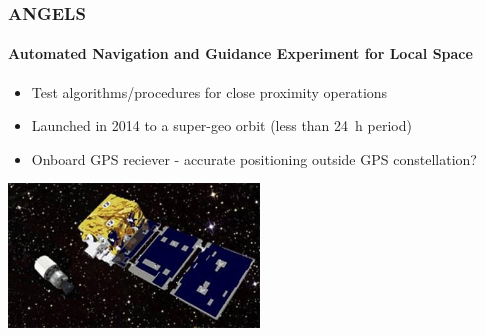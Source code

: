 \begin{frame}[t]\frametitle{ANGELS}
    \framesubtitle{Automated Navigation and Guidance Experiment for Local Space}
    \begin{itemize}
        \item Test algorithms/procedures for close proximity operations
        \item Launched in 2014 to a super-geo orbit (less than \SI{24}{\hour} period)
        \item Onboard GPS reciever - accurate positioning outside GPS constellation?
    \end{itemize}
    \begin{center}
        \includegraphics[width=0.5\textwidth,height=0.8\textwidth,keepaspectratio]{figures/airforce/angels.jpg}
    \end{center}
\end{frame}

